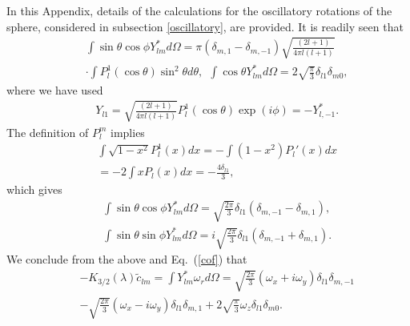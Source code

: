 \documentclass[aps,prx,twocolumn,amsmath,amssymb,amsfonts]{revtex4-2}
\begin{document}
{{\begin{appendices}
In this Appendix, details of the calculations for the oscillatory rotations of the sphere, considered in subsection \ref{oscillatory}, are provided. It is readily seen that
\begin{eqnarray}&&
\int \sin\theta\cos\phi Y_{lm}^* d\Omega=\pi (\delta_{m, 1}-\delta_{m, -1})\sqrt{\frac{(2l+1)}{4\pi l (l+1)}}
\nonumber\\&&
\cdot\int P_l^1(\cos\theta)\sin^2\theta d\theta,\ \  \int \cos\theta Y_{lm}^* d\Omega\!=\!
2\sqrt{\frac{\pi}{3}}\delta_{l1}\delta_{m0},\nonumber
\end{eqnarray}
where we have used
\begin{eqnarray}&&
Y_{l1}=\sqrt{\frac{(2l+1)}{4\pi l(l+1)}}P_l^1(\cos\theta)\exp\left(i\phi\right)=-Y_{l,-1}^*.\label{sd}%
\end{eqnarray}
The definition of $P_l^m$ implies
\begin{eqnarray}&&
\int  \sqrt{1-x^2} P_l^1(x) dx=-\int (1-x^2) P_l'(x) dx
\nonumber\\&&
=-2\int x P_l(x) dx=-\frac{4\delta_{l1}}{3},
\end{eqnarray}
which gives
\begin{eqnarray}&&
\int \sin\theta\cos\phi Y_{lm}^* d\Omega=\sqrt{\frac{2\pi}{3}} \delta_{l1}(\delta_{m, -1}-\delta_{m, 1}),
\nonumber\\&&
\int \sin\theta\sin\phi Y_{lm}^* d\Omega=i\sqrt{\frac{2\pi}{3}} \delta_{l1}(\delta_{m, -1}+\delta_{m, 1}).
\end{eqnarray}
We conclude from the above and Eq.~(\ref{cof}) that
\begin{eqnarray}&&
-K_{3/2}(\lambda){\tilde c}_{lm}=\int Y_{lm}^*\omega_r d\Omega\!=\!\sqrt{\frac{2\pi}{3}} \left(\omega_x+i\omega_y\right)\delta_{l1}\delta_{m, -1}
\nonumber\\&&
- \sqrt{\frac{2\pi}{3}}(\omega_x-i \omega_y) \delta_{l1}\delta_{m, 1}+ 2\sqrt{\frac{\pi}{3}}\omega_z\delta_{l1}\delta_{m0}. \label{refe}
\end{eqnarray}

\end{appendices}}}
\end{document}
